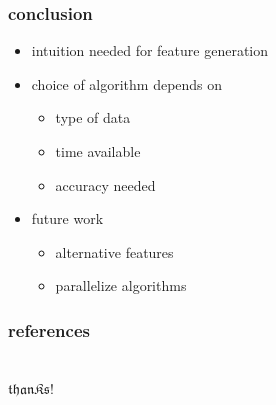 \begin{frame}[c]
\frametitle{conclusion}

	\begin{itemize}
		\setlength{\itemindent}{5em}
		\item intuition needed for feature generation
		\item choice of algorithm depends on
                  \begin{itemize}
                     \setlength{\itemindent}{6em}
                    \item type of data
                    \item time available
                    \item accuracy needed
                  \end{itemize}
		\item future work
		\begin{itemize}
			\setlength{\itemindent}{6em}
			\item alternative features
			\item parallelize algorithms
		\end{itemize}
	\end{itemize}

\end{frame}

\begin{frame}%

	\frametitle{references}
	
	

\end{frame}

\begingroup
{}
\begin{frame}[plain]

	\frametitle{}
	\centering\Huge\color{Red}
	\vfill
	~\\
	$\mathfrak{thanKs!}$
	\vfill

\end{frame}
\endgroup